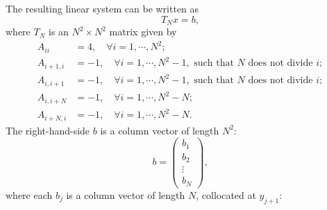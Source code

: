 \documentclass[paper=a4, fontsize=11pt]{scrartcl} %
\numberwithin{equation}{section} %
\numberwithin{figure}{section} %
\numberwithin{table}{section} %
\begin{document}
The resulting linear system can be written as
$$T_N x =b,$$
where $T_N$ is an $N^2\times N^2$ matrix given by
\begin{align}
\nonumber A_{ii}&=4, \quad \forall i=1,\cdots,N^2;\\
\nonumber A_{i+1,i} &= -1, \quad \forall i=1,\cdots,N^2-1, \text{ such that } N \text{ does not divide } i;\\
\nonumber A_{i,i+1} &= -1, \quad \forall i=1,\cdots,N^2-1, \text{ such that } N \text{ does not divide } i;\\
\nonumber A_{i,i+N} &= -1, \quad \forall i=1,\cdots,N^2-N;\\
\nonumber A_{i+N,i} &= -1, \quad \forall i=1,\cdots,N^2-N.
\end{align}
The right-hand-side $b$ is a column vector of length $N^2$:
$$
b = \begin{pmatrix}
b_1\\
b_2\\
\vdots\\
b_N
\end{pmatrix},
$$
where each $b_j$ is a column vector of length $N$, collocated at $y_{j+1}$:
\end{document}
